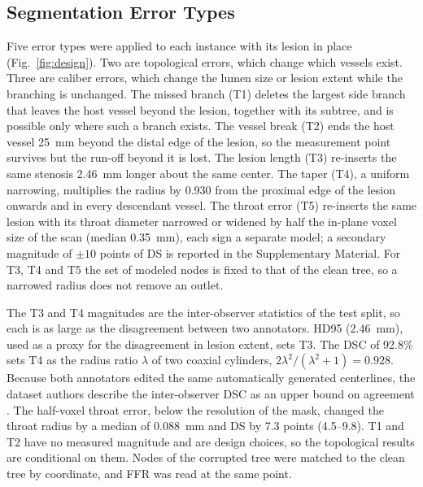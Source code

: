 \documentclass[journal,twoside,web]{ieeecolor}
\begin{document}
\subsection{Segmentation Error Types}
Five error types were applied to each instance with its lesion in place (Fig.~\ref{fig:design}). Two are
topological errors, which change which vessels exist. Three are caliber errors, which change the lumen size or lesion
extent while the branching is unchanged. The missed branch (T1) deletes the largest side branch that leaves the host
vessel beyond the lesion, together with its subtree, and is possible only where such a branch exists. The vessel break (T2) ends the host vessel 25~mm beyond the
distal edge of the lesion, so the measurement point survives but the run-off beyond it is lost. The lesion length
(T3) re-inserts the same stenosis 2.46~mm longer about the same center. The taper (T4), a uniform narrowing, multiplies the radius by 0.930 from the proximal
edge of the lesion onwards and in every descendant vessel. The throat error (T5) re-inserts the same lesion with its
throat diameter narrowed or widened by half the in-plane voxel size of the scan (median 0.35~mm), each sign a
separate model; a secondary magnitude of $\pm 10$ points of DS is reported in the Supplementary Material. For T3, T4 and T5 the set of modeled nodes is fixed to that
of the clean tree, so a narrowed radius does not remove an outlet.

The T3 and T4 magnitudes are the inter-observer statistics of the test split, so each is as large as
the disagreement between two annotators. HD95 (2.46~mm), used as a proxy for the disagreement in lesion extent, sets T3. The DSC of 92.8\% sets T4 as the radius
ratio $\lambda$ of two coaxial cylinders, $2\lambda^2/(\lambda^2+1) = 0.928$. Because both annotators edited the same automatically
generated centerlines, the dataset authors describe the inter-observer DSC as an upper bound on agreement \cite{bransby2026}. The half-voxel
throat error, below the resolution of the mask, changed the throat radius by a median of 0.088~mm and DS by 7.3 points (4.5--9.8). T1 and T2 have
no measured magnitude and are design choices, so the topological results are conditional on them. Nodes of the corrupted tree were matched to the clean tree by
coordinate, and FFR was read at the same point.
\end{document}
